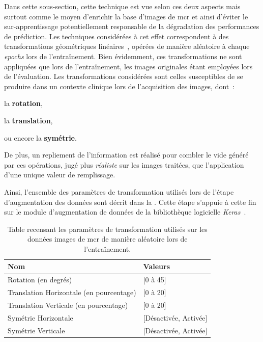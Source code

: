 Dans cette sous-section, cette technique est vue selon ces deux aspects mais surtout comme le moyen d'enrichir la base d'images de \gls{mcr} et ainsi d'éviter le sur-apprentissage potentiellement responsable de la dégradation des performances de prédiction. Les techniques considérées à cet effet correspondent à des transformations géométriques linéaires~\cite{Taylor2018}, opérées de manière aléatoire à chaque \textit{epochs} lors de l'entraînement. Bien évidemment, ces transformations ne sont appliquées que lors de l'entraînement, les images originales étant employées lors de l'évaluation. Les transformations considérées sont celles susceptibles de se produire dans un contexte clinique lors de l'acquisition des images, dont~:
\begin{inlinerate}
    \item la \textbf{rotation},
    \item la \textbf{translation},
    \item ou encore la \textbf{symétrie}.
\end{inlinerate} De plus, un repliement de l'information est réalisé pour combler le vide généré par ces opérations, jugé plus \textit{réaliste} sur les images traitées, que l'application d'une unique valeur de remplissage.\par

Ainsi, l'ensemble des paramètres de transformation utilisés lors de l'étape d'augmentation des données sont décrit dans la . Cette étape s'appuie à cette fin sur le module d'augmentation de données de la bibliothèque logicielle \textit{Keras}~\cite{chollet2015}.\par

\begin{table}[H]
    \centering
    \begin{tabular}{ll}
        \toprule
        \textbf{Nom}                            & \textbf{Valeurs}      \\ \midrule
        Rotation (en degrés)                    & [0 à 45]              \\ 
        Translation Horizontale (en pourcentage)& [0 à 20]              \\ 
        Translation Verticale (en pourcentage)  & [0 à 20]              \\  
        Symétrie Horizontale                    & [Désactivée, Activée]  \\  
        Symétrie Verticale                      & [Désactivée, Activée]  \\ 
        \bottomrule 
    \end{tabular} 
    \caption{Table recensant les paramètres de transformation utilisés sur les données images de \gls{mcr} de manière aléatoire lors de l'entraînement.}
    \label{tab:parameters_image_improvement_data_augmentation}
\end{table}\par

